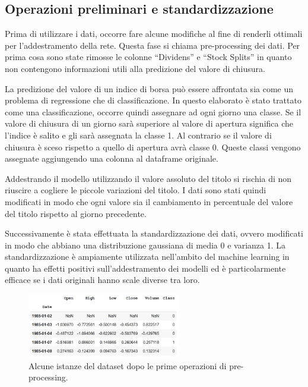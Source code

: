 \documentclass[12pt,a4paper,twoside,openright]{book}
\begin{document}
\subsection{Operazioni preliminari e standardizzazione}
Prima di utilizzare i dati, occorre fare alcune modifiche al fine di renderli ottimali per l’addestramento della rete. Questa fase si chiama pre-processing dei dati.
Per prima cosa sono state rimosse le colonne “Dividens” e “Stock Splits” in quanto non contengono informazioni utili alla predizione del valore di chiusura.

La predizione del valore di un indice di borsa può essere affrontata sia come un problema di regressione che di classificazione. In questo elaborato è stato trattato come una classificazione, occorre quindi assegnare ad ogni giorno una classe. Se il valore di chiusura di un giorno sarà superiore al valore di apertura significa che l’indice è salito e gli sarà assegnata la classe 1. Al contrario se il valore di chiusura è sceso rispetto a quello di apertura avrà classe 0. Queste classi vengono assegnate aggiungendo una colonna al dataframe originale.

Addestrando il modello utilizzando il valore assoluto del titolo si rischia di non riuscire a cogliere le piccole variazioni del titolo. I dati sono stati quindi modificati in modo che ogni valore sia il cambiamento in percentuale del valore del titolo rispetto al giorno precedente.

Successivamente è stata effettuata la standardizzazione dei dati, ovvero modificati in modo che abbiano una distribuzione gaussiana di media 0 e varianza 1.
La standardizzazione è ampiamente utilizzata nell’ambito del machine learning in quanto ha effetti positivi sull’addestramento dei modelli ed è particolarmente efficace se i dati originali hanno scale diverse tra loro.

\begin{figure}[H]
\centering
\includegraphics[width=0.6\textwidth]{images/data2.png}
\caption{Alcune istanze del dataset dopo le prime operazioni di pre-processing.}
\label{fig:rapp_file}
\end{figure}
\end{document}
